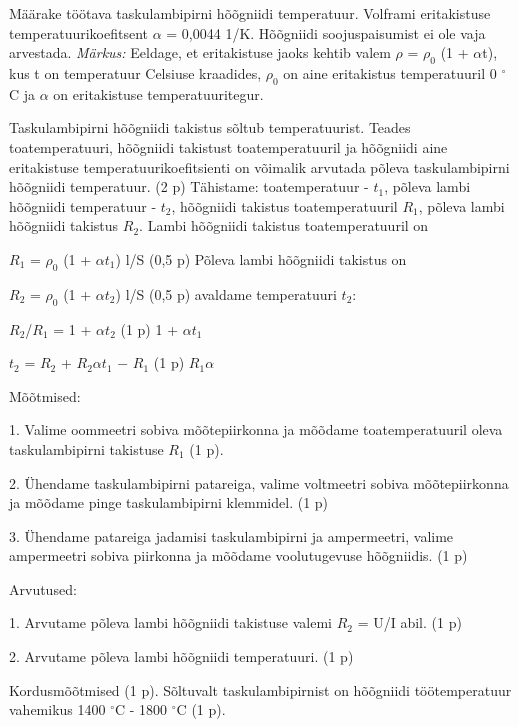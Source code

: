 
Määrake töötava taskulambipirni hõõgniidi temperatuur. Volframi eritakistuse temperatuurikoefitsent $\alpha$ = 0,0044 1/K. Hõõgniidi soojuspaisumist ei ole vaja arvestada.
\textit{Märkus:} Eeldage, et eritakistuse jaoks kehtib valem $\rho$ = $\rho_0$ (1 + $\alpha$t), kus t on temperatuur Celsiuse kraadides, $\rho_0$ on aine eritakistus temperatuuril 0 $^\circ$C ja $\alpha$ on eritakistuse temperatuuritegur.

\hint

\solu
Taskulambipirni hõõgniidi takistus sõltub temperatuurist. Teades toatemperatuuri, hõõgniidi takistust toatemperatuuril ja hõõgniidi aine eritakistuse temperatuurikoefitsienti on võimalik arvutada põleva taskulambipirni hõõgniidi temperatuur. (2 p) Tähistame: toatemperatuur - $t_1$, põleva lambi hõõgniidi temperatuur - $t_2$, hõõgniidi takistus toatemperatuuril $R_1$, põleva lambi hõõgniidi takistus $R_2$. Lambi hõõgniidi takistus toatemperatuuril on

$R_1$ = $\rho_0$ (1 + $\alpha$$t_1$) l/S (0,5 p) Põleva lambi hõõgniidi takistus on

$R_2$ = $\rho_0$ (1 + $\alpha$$t_2$) l/S (0,5 p) avaldame temperatuuri $t_2$:

$R_2$/$R_1$ = 1 + $\alpha$$t_2$ (1 p) 1 + $\alpha$$t_1$

$t_2$ = $R_2$ + $R_2$$\alpha$$t_1$ $-$ $R_1$ (1 p) $R_1$$\alpha$

Mõõtmised:

1. Valime oommeetri sobiva mõõtepiirkonna ja mõõdame toatemperatuuril oleva taskulambipirni takistuse $R_1$ (1 p).

2. Ühendame taskulambipirni patareiga, valime voltmeetri sobiva mõõtepiirkonna ja mõõdame pinge taskulambipirni klemmidel. (1 p)

3. Ühendame patareiga jadamisi taskulambipirni ja ampermeetri, valime ampermeetri sobiva piirkonna ja mõõdame voolutugevuse hõõgniidis. (1 p)

Arvutused:

1. Arvutame põleva lambi hõõgniidi takistuse valemi $R_2$ = U/I abil. (1 p)

2. Arvutame põleva lambi hõõgniidi temperatuuri. (1 p)

Kordusmõõtmised (1 p). Sõltuvalt taskulambipirnist on hõõgniidi töötemperatuur vahemikus 1400 $^\circ$C - 1800 $^\circ$C (1 p).
\probend

